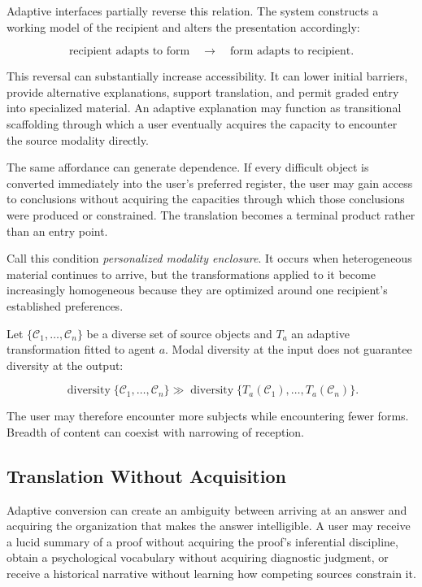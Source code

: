 \documentclass[11pt]{article}
\newcommand{\term}[1]{\emph{#1}}
\newcommand{\contentobj}{\mathcal{C}}
\begin{document}
Adaptive interfaces partially reverse this relation. The system constructs a
working model of the recipient and alters the presentation accordingly:

\begin{equation}
  \text{recipient adapts to form}
  \quad\longrightarrow\quad
  \text{form adapts to recipient}.
  \label{eq:adaptation-reversal}
\end{equation}

This reversal can substantially increase accessibility. It can lower initial
barriers, provide alternative explanations, support translation, and permit
graded entry into specialized material. An adaptive explanation may function
as transitional scaffolding through which a user eventually acquires the
capacity to encounter the source modality directly.

The same affordance can generate dependence. If every difficult object is
converted immediately into the user's preferred register, the user may gain
access to conclusions without acquiring the capacities through which those
conclusions were produced or constrained. The translation becomes a terminal
product rather than an entry point.

Call this condition \term{personalized modality enclosure}. It occurs when
heterogeneous material continues to arrive, but the transformations applied to
it become increasingly homogeneous because they are optimized around one
recipient's established preferences.

Let \(\{\contentobj_1,\ldots,\contentobj_n\}\) be a diverse set of source
objects and \(T_a\) an adaptive transformation fitted to agent \(a\). Modal
diversity at the input does not guarantee diversity at the output:

\begin{equation}
  \operatorname{diversity}
  \{\contentobj_1,\ldots,\contentobj_n\}
  \gg
  \operatorname{diversity}
  \{T_a(\contentobj_1),\ldots,T_a(\contentobj_n)\}.
  \label{eq:modal-homogenization}
\end{equation}

The user may therefore encounter more subjects while encountering fewer forms.
Breadth of content can coexist with narrowing of reception.

\subsection{Translation Without Acquisition}

Adaptive conversion can create an ambiguity between arriving at an answer and
acquiring the organization that makes the answer intelligible. A user may
receive a lucid summary of a proof without acquiring the proof's inferential
discipline, obtain a psychological vocabulary without acquiring diagnostic
judgment, or receive a historical narrative without learning how competing
sources constrain it.
\end{document}
